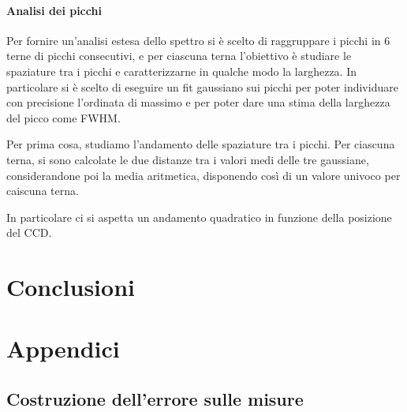 \documentclass{article}
\begin{document}
\paragraph{Analisi dei picchi}


Per fornire un'analisi estesa dello spettro si è scelto di raggruppare
i picchi in 6 terne di picchi consecutivi, e per ciascuna terna
l'obiettivo è studiare le spaziature tra i picchi e caratterizzarne in
qualche modo la larghezza. 
In particolare si è scelto di eseguire un fit gaussiano sui picchi
per poter individuare con precisione l'ordinata di massimo e per
poter dare una stima della larghezza del picco come FWHM.

Per prima cosa, studiamo l'andamento delle spaziature tra i picchi. 
Per ciascuna terna, si sono calcolate le due distanze tra i valori medi
delle tre gaussiane, considerandone poi la media aritmetica, disponendo
così di un valore univoco per caiscuna terna.

In particolare ci si aspetta un andamento quadratico in funzione della posizione del CCD.





\section*{Conclusioni}



\newpage
\appendix
\section{Appendici}
\label{appendice}
\subsection{Costruzione dell'errore sulle misure}
\label{Calcerr}
\end{document}
